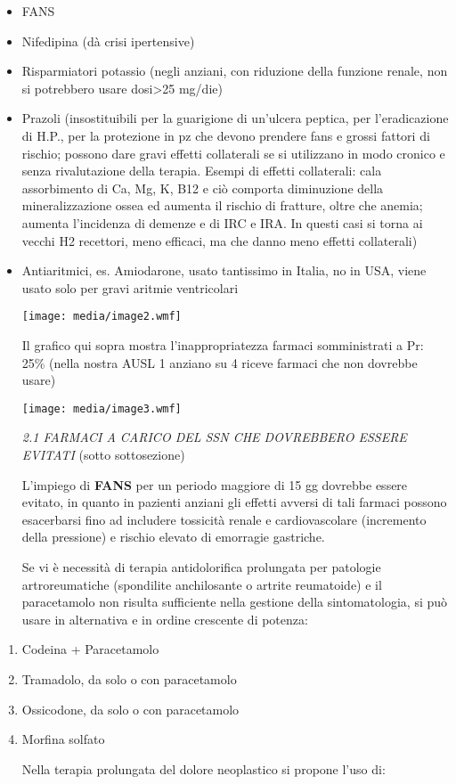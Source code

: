 \documentclass[]{article}
\begin{document}
\begin{itemize}
\item
  FANS
\item
  Nifedipina (dà crisi ipertensive)
\item
  Risparmiatori potassio (negli anziani, con riduzione della funzione
  renale, non si potrebbero usare dosi\textgreater{}25 mg/die)
\item
  Prazoli (insostituibili per la guarigione di un'ulcera peptica, per
  l'eradicazione di H.P., per la protezione in pz che devono prendere
  fans e grossi fattori di rischio; possono dare gravi effetti
  collaterali se si utilizzano in modo cronico e senza rivalutazione
  della terapia. Esempi di effetti collaterali: cala assorbimento di Ca,
  Mg, K, B12 e ciò comporta diminuzione della mineralizzazione ossea ed
  aumenta il rischio di fratture, oltre che anemia; aumenta l'incidenza
  di demenze e di IRC e IRA. In questi casi si torna ai vecchi H2
  recettori, meno efficaci, ma che danno meno effetti collaterali)
\item
  Antiaritmici, es. Amiodarone, usato tantissimo in Italia, no in USA,
  viene usato solo per gravi aritmie ventricolari

  \texttt{[image: media/image2.wmf]}

  Il grafico qui sopra mostra l'inappropriatezza farmaci somministrati a
  Pr: 25\% (nella nostra AUSL 1 anziano su 4 riceve farmaci che non
  dovrebbe usare)

  \texttt{[image: media/image3.wmf]}

  \emph{2.1 FARMACI A CARICO DEL SSN CHE DOVREBBERO ESSERE EVITATI}
  (sotto sottosezione)

  L'impiego di \textbf{FANS} per un periodo maggiore di 15 gg dovrebbe
  essere evitato, in quanto in pazienti anziani gli effetti avversi di
  tali farmaci possono esacerbarsi fino ad includere tossicità renale e
  cardiovascolare (incremento della pressione) e rischio elevato di
  emorragie gastriche.

  Se vi è necessità di terapia antidolorifica prolungata per patologie
  artroreumatiche (spondilite anchilosante o artrite reumatoide) e il
  paracetamolo non risulta sufficiente nella gestione della
  sintomatologia, si può usare in alternativa e in ordine crescente di
  potenza:
\end{itemize}

\begin{enumerate}
\def\labelenumi{\arabic{enumi}.}
\item
  Codeina + Paracetamolo
\item
  Tramadolo, da solo o con paracetamolo
\item
  Ossicodone, da solo o con paracetamolo
\item
  Morfina solfato

  Nella terapia prolungata del dolore neoplastico si propone l'uso di:
\end{enumerate}
\end{document}
